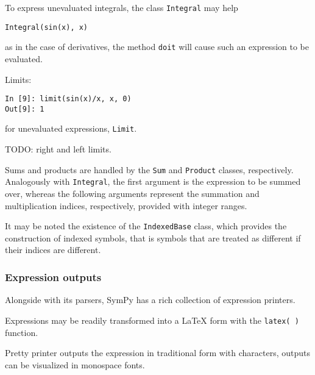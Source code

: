 To express unevaluated integrals, the class \verb|Integral| may help
\begin{verbatim}
Integral(sin(x), x)
\end{verbatim}
as in the case of derivatives, the method \verb|doit| will cause such an expression
to be evaluated.

Limits:
\begin{verbatim}
In [9]: limit(sin(x)/x, x, 0)
Out[9]: 1
\end{verbatim}
for unevaluated expressions, \verb|Limit|.

TODO: right and left limits.

Sums and products are handled by the \texttt{Sum} and \texttt{Product} classes,
respectively.
Analogously with \texttt{Integral}, the first argument is the expression to be
summed over, whereas the following arguments represent the summation and
multiplication indices, respectively, provided with integer ranges.

It may be noted the existence of the \texttt{IndexedBase} class,
which provides the construction of indexed symbols, that is symbols that are
treated as different if their indices are different.


\subsubsection{Expression outputs}

Alongside with its parsers, SymPy has a rich collection of expression printers.

Expressions may be readily transformed into a LaTeX form with the \texttt{latex( )}
function.

Pretty printer outputs the expression in traditional form with characters,
outputs can be visualized in monospace fonts.
